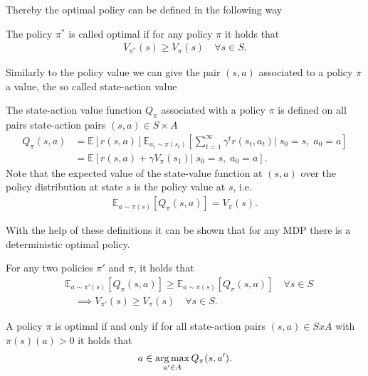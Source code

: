Thereby the optimal policy can be defined in the following way
\begin{definition}
    The policy $\pi^{*}$ is called optimal if for any policy $\pi$ it
    holds that
    \begin{align}
        V_{\pi^{*}}(s) \ge V_\pi(s) \quad \forall s \in S.
    \end{align}
\end{definition}
Similarly to the policy value we can give the pair $(s, a)$ associated to a
policy $\pi$ a value, the so called state-action value
\begin{definition}
    The state-action value function $Q_\pi$ associated with a policy $\pi$ is
    defined on all pairs state-action pairs $(s, a) \in S \times A$
    \begin{align}
        Q_\pi(s, a) &= \mathbb{E}[r(s,a)]
        \mathbb{E}_{a_t\sim\pi(s_t)}\left[ \sum_{t=1}^{\infty}\gamma^{t}
            r(s_t, a_t)\Bigg |\; s_0 = s,\; a_0 = a \right] \\
        \nonumber
            &= \mathbb{E}\left[r(s,a) + \gamma V_\pi(s_1)\Big| \;s_0=s,\;
            a_0=a   \right].
    \end{align}
    Note that the expected value of the state-value function at $(s, a)$ over the policy
    distribution at state $s$ is the policy value at $s$, i.e.
    \begin{align}
        \mathbb{E}_{a\sim\pi(s)}\left[Q_\pi(s, a)\right] = V_\pi(s).
    \end{align}
\end{definition}
With the help of these definitions it can be shown that for any MDP there is
a deterministic optimal policy.
\begin{theorem}
    For any two policies $\pi'$ and $\pi$, it holds that
    \begin{align}
         &\mathbb{E}_{a\sim\pi'(s)}\left[Q_\pi(s, a)\right]
        \ge \mathbb{E}_{a\sim\pi(s)}\left[Q_\pi(s, a)\right]  \quad \forall s \in S
        \\
         &\quad \implies  V_{\pi'}(s) \ge V_\pi (s) \quad
         \forall s \in S\nonumber.
    \end{align}
\end{theorem}
\begin{theorem}
    A policy $\pi$ is optimal if and only if for all state-action pairs
    $(s, a) \in S x A$ with $\pi(s)(a) > 0$ it holds that
    \begin{align}
        a \in \operatorname*{arg\,max}_{a'\in A} Q_\pi(s, a').
    \end{align}
\end{theorem}
